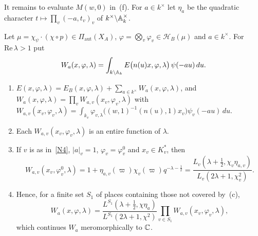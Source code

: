 It remains to evaluate $M(w,0)$ in~(f). For $a\in k^\times$ let $\eta_a$
be the quadratic character $t\mapsto\prod_v(-a,t_v)_v$ of
$k^\times\backslash\mathbb{A}_k^\times$.

\begin{lemma}\label{lem:whittaker}
Let $\mu=\chi_\psi\cdot(\chi\circ p)\in\Pi_{\mathrm{aut}}(X_A)$,
$\varphi=\bigotimes_v\varphi_v\in\mathcal H_B(\mu)$ and $a\in k^\times$.
For $\mathrm{Re}\,\lambda>1$ put
\[
W_a(x,\varphi,\lambda)=\int_{k\backslash\mathbb{A}_k}E\bigl(n(u)x,\varphi,\lambda
\bigr)\,\psi(-au)\,du .
\]
\begin{enumerate}[label=(\alph*)]
\item $E(x,\varphi,\lambda)=E_B(x,\varphi,\lambda)+\sum_{a\in k^\times}
  W_a(x,\varphi,\lambda)$, and
  $W_a(x,\varphi,\lambda)=\prod_vW_{a,v}(x_v,\varphi_v,\lambda)$ with
  $W_{a,v}(x_v,\varphi_v,\lambda)=\int_{k_v}\varphi_{v,\lambda}\bigl((w,1)^{-1}
  (n(u),1)x_v\bigr)\psi_v(-au)\,du$.
\item Each $W_{a,v}(x_v,\varphi_v,\lambda)$ is an entire function of
  $\lambda$.
\item If $v$ is as in~\ref{N4}, $|a|_v=1$, $\varphi_v=\varphi_v^0$ and
  $x_v\in K_v^*$, then
  \[
  W_{a,v}(x_v,\varphi^0_v,\lambda)=1+\eta_{a,v}(\varpi)\chi_v(\varpi)
  q^{-\lambda-\frac12}=\frac{L_v(\lambda+\frac12,\chi_v\eta_{a,v})}
  {L_v(2\lambda+1,\chi_v^2)} .
  \]
\item Hence, for a finite set $S_1$ of places containing those not covered
  by~(c),
  \[
  W_a(x,\varphi,\lambda)=\frac{L^{S_1}(\lambda+\frac12,\chi\eta_a)}
  {L^{S_1}(2\lambda+1,\chi^2)}\prod_{v\in S_1}W_{a,v}(x_v,\varphi_v,\lambda),
  \]
  which continues $W_a$ meromorphically to $\mathbb{C}$.
\end{enumerate}
\end{lemma}

